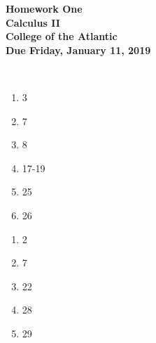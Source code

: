 \documentclass[12pt]{article}
\begin{document}
\pagestyle{empty}
 
\begin{center}
{\LARGE {\bf Homework One}}\\
\bigskip
{\Large {\bf Calculus II}}\\
\bigskip
{\Large {\bf College of the Atlantic}}\\
\bigskip
{ {\bf Due Friday, January 11, 2019}}\\ 
\end{center}

\hspace{2mm}\\


\begin{enumerate}
\setlength{\itemsep}{-1mm}
  \item 3
  \item 7
  \item 8
  \item 17-19
  \item 25
  \item 26 

\end{enumerate}



\begin{enumerate}
\setlength{\itemsep}{-1mm}
  \item 2
  \item 7
  \item 22
  \item 28
  \item 29
\end{enumerate}
\end{document}
